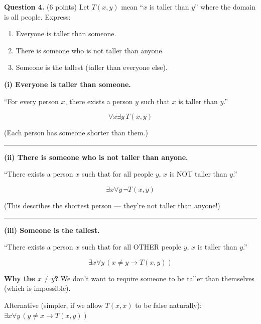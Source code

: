 \documentclass[11pt,a4paper]{article}
\begin{document}
\vspace{15pt}

\textbf{Question 4.} (6 points) Let $T(x, y)$ mean ``$x$ is taller than $y$'' where the domain is all people. Express:

\begin{enumerate}[label=(\roman*)]
    \item Everyone is taller than someone.
    \item There is someone who is not taller than anyone.
    \item Someone is the tallest (taller than everyone else).
\end{enumerate}

\begin{solnbox}
\textbf{(i) Everyone is taller than someone.}

``For every person $x$, there exists a person $y$ such that $x$ is taller than $y$.''

$$\boxed{\forall x \exists y\, T(x, y)}$$

(Each person has someone shorter than them.)

\rule{\linewidth}{0.3pt}

\textbf{(ii) There is someone who is not taller than anyone.}

``There exists a person $x$ such that for all people $y$, $x$ is NOT taller than $y$.''

$$\boxed{\exists x \forall y\, \neg T(x, y)}$$

(This describes the shortest person --- they're not taller than anyone!)

\rule{\linewidth}{0.3pt}

\textbf{(iii) Someone is the tallest.}

``There exists a person $x$ such that for all OTHER people $y$, $x$ is taller than $y$.''

$$\boxed{\exists x \forall y\, (x \neq y \to T(x, y))}$$

\textbf{Why the $x \neq y$?} We don't want to require someone to be taller than themselves (which is impossible).

Alternative (simpler, if we allow $T(x,x)$ to be false naturally):
$\exists x \forall y\, (y \neq x \to T(x, y))$
\end{solnbox}

\newpage

\end{document}
